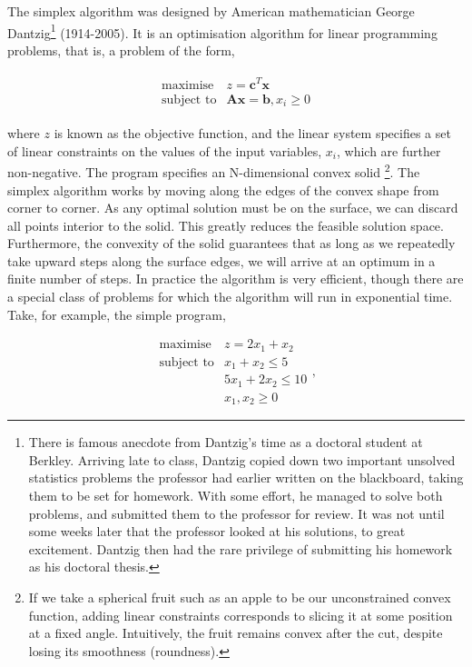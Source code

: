 \documentclass[11pt]{amsart}
\begin{document}
The simplex algorithm was designed by American mathematician George Dantzig\footnote{There is famous anecdote from Dantzig's time as a doctoral student at Berkley. Arriving late to class, Dantzig copied down two important unsolved statistics problems the professor had earlier written on the blackboard, taking them to be set for homework. With some effort, he managed to solve both problems, and submitted them to the professor for review. It was not until some weeks later that the professor looked at his solutions, to great excitement. Dantzig then had the rare privilege of submitting his homework as his doctoral thesis.} (1914-2005). It is an optimisation algorithm for linear programming problems, that is, a problem of the form,

\begin{align}
\begin{array}{rl}
\text{maximise} & z = \mathbf{c}^T\mathbf{x} \\
\text{subject to} & \mathbf{A}\mathbf{x} = \mathbf{b}, x_i \geq 0
\end{array}
\label{eq:linprog}
\end{align}

where $z$ is known as the objective function, and the linear system specifies a set of linear constraints on the values of the input variables, $x_i$, which are further non-negative. The program specifies an N-dimensional convex solid \footnote{If we take a spherical fruit such as an apple to be our unconstrained convex function, adding linear constraints corresponds to slicing it at some position at a fixed angle. Intuitively, the fruit remains convex after the cut, despite losing its smoothness (roundness).}. The simplex algorithm works by moving along the edges of the convex shape from corner to corner. As any optimal solution must be on the surface, we can discard all points interior to the solid. This greatly reduces the feasible solution space. Furthermore, the convexity of the solid guarantees that as long as we repeatedly take upward steps along the surface edges, we will arrive at an optimum in a finite number of steps. In practice the algorithm is very efficient, though there are a special class of problems for which the algorithm will run in exponential time. Take, for example, the simple program,

$$
\begin{array}{rl}
\text{maximise} & z = 2x_1 + x_2 \\
\text{subject to} & x_1 + x_2 \leq 5 \\
& 5x_1 + 2x_2 \leq 10 \\
& x_1, x_2 \geq 0
\end{array},
$$
\end{document}
